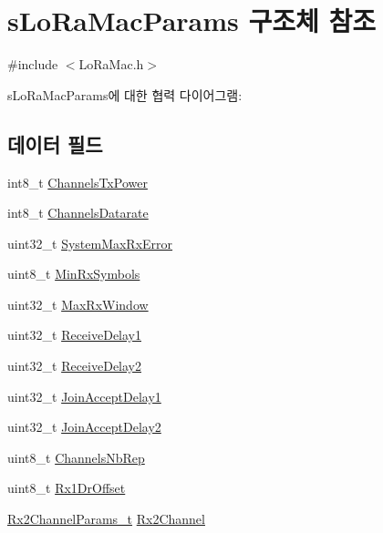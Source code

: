 \hypertarget{structs_lo_ra_mac_params}{}\section{s\+Lo\+Ra\+Mac\+Params 구조체 참조}
\label{structs_lo_ra_mac_params}


{\ttfamily \#include $<$Lo\+Ra\+Mac.\+h$>$}



s\+Lo\+Ra\+Mac\+Params에 대한 협력 다이어그램\+:
\subsection*{데이터 필드}
\begin{DoxyCompactItemize}
\item 
int8\+\_\+t \mbox{\hyperlink{structs_lo_ra_mac_params_ad015aefb498e98276b4102f847b05d0e}{Channels\+Tx\+Power}}
\item 
int8\+\_\+t \mbox{\hyperlink{structs_lo_ra_mac_params_a6c741587260d08d1b883922ce9ca345e}{Channels\+Datarate}}
\item 
uint32\+\_\+t \mbox{\hyperlink{structs_lo_ra_mac_params_a62adc341212fe903e9995966051c5fee}{System\+Max\+Rx\+Error}}
\item 
uint8\+\_\+t \mbox{\hyperlink{structs_lo_ra_mac_params_ab33f97482f9af163d593cf103a2ccf1c}{Min\+Rx\+Symbols}}
\item 
uint32\+\_\+t \mbox{\hyperlink{structs_lo_ra_mac_params_ace391217d534408b8f2af268a4ef0945}{Max\+Rx\+Window}}
\item 
uint32\+\_\+t \mbox{\hyperlink{structs_lo_ra_mac_params_a426f0e1108ebe3ba1b05c2853c0b0c3a}{Receive\+Delay1}}
\item 
uint32\+\_\+t \mbox{\hyperlink{structs_lo_ra_mac_params_a67fbe3fba2eb31f8879ea22674dd50d8}{Receive\+Delay2}}
\item 
uint32\+\_\+t \mbox{\hyperlink{structs_lo_ra_mac_params_a59ed32d2c7ce6d0b2011da8b0109b391}{Join\+Accept\+Delay1}}
\item 
uint32\+\_\+t \mbox{\hyperlink{structs_lo_ra_mac_params_ae4a12f9dc83c6cedcf8afc05fb9ea06f}{Join\+Accept\+Delay2}}
\item 
uint8\+\_\+t \mbox{\hyperlink{structs_lo_ra_mac_params_a50c64c3d572cd688816904f8bf2252c7}{Channels\+Nb\+Rep}}
\item 
uint8\+\_\+t \mbox{\hyperlink{structs_lo_ra_mac_params_a7de51959047aa36190c0a59485397244}{Rx1\+Dr\+Offset}}
\item 
\mbox{\hyperlink{group___l_o_r_a_m_a_c_ga8f57f29481ea92c24f6af04b96a95e0f}{Rx2\+Channel\+Params\+\_\+t}} \mbox{\hyperlink{structs_lo_ra_mac_params_aa0fbe93ff398020c65d2431af19368e8}{Rx2\+Channel}}

\end{DoxyCompactItemize}
